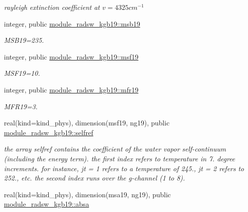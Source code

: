 \begin{Indent}
\begin{DoxyCompactItemize}
\begin{DoxyCompactList}\small\item\em rayleigh extinction coefficient at $v=4325 cm^{-1}$ \end{DoxyCompactList}\item 
integer, public \hyperlink{group__module__radsw__kgbnn_ga42771fcf9dd17b5c9d0d03cb2bf1c923}{module\+\_\+radsw\+\_\+kgb19\+::msb19}
\begin{DoxyCompactList}\small\item\em M\+S\+B19=235. \end{DoxyCompactList}\item 
integer, public \hyperlink{group__module__radsw__kgbnn_ga86778b12ff439f4f83fda891e7ae2bfe}{module\+\_\+radsw\+\_\+kgb19\+::msf19}
\begin{DoxyCompactList}\small\item\em M\+S\+F19=10. \end{DoxyCompactList}\item 
integer, public \hyperlink{group__module__radsw__kgbnn_ga57f837ef4316dc2441bca3fde3998156}{module\+\_\+radsw\+\_\+kgb19\+::mfr19}
\begin{DoxyCompactList}\small\item\em M\+F\+R19=3. \end{DoxyCompactList}\item 
real(kind=kind\+\_\+phys), dimension(msf19, ng19), public \hyperlink{group__module__radsw__kgbnn_gadb26cae00c05ac5c048a4db5a319a2eb}{module\+\_\+radsw\+\_\+kgb19\+::selfref}
\begin{DoxyCompactList}\small\item\em the array selfref contains the coefficient of the water vapor self-\/continuum (including the energy term). the first index refers to temperature in 7. degree increments. for instance, jt = 1 refers to a temperature of 245., jt = 2 refers to 252., etc. the second index runs over the g-\/channel (1 to 8). \end{DoxyCompactList}\item 
real(kind=kind\+\_\+phys), dimension(msa19, ng19), public \hyperlink{group__module__radsw__kgbnn_gad9a6fc80122a2f06d9f2277d74e00c85}{module\+\_\+radsw\+\_\+kgb19\+::absa}

\end{DoxyCompactItemize}
\end{Indent}
